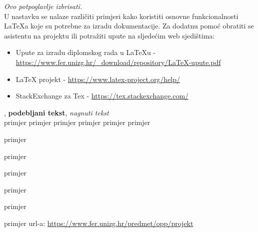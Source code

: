 \textit{Ovo potpoglavlje izbrisati.}\\

U nastavku se nalaze različiti primjeri kako koristiti osnovne funkcionalnosti LaTeXa koje su potrebne za izradu dokumentacije. Za dodatnu pomoć obratiti se asistentu na projektu ili potražiti upute na sljedećim web sjedištima:
\begin{itemize}
	\item Upute za izradu diplomskog rada u LaTeXu - \url{https://www.fer.unizg.hr/_download/repository/LaTeX-upute.pdf}
	\item LaTeX projekt - \url{https://www.latex-project.org/help/}
	\item StackExchange za Tex - \url{https://tex.stackexchange.com/}\\
	
\end{itemize} 	




, 
\textbf{podebljani tekst}, 
\textit{nagnuti tekst}\\
\normalsize primjer
\large primjer
\Large primjer
\LARGE {primjer}
\huge {primjer}
\Huge primjer
\normalsize

\begin{packed_item}
	
	\item  primjer
	\item  primjer
	\item  primjer
	\item[] \begin{packed_enum}
		
		\item primjer
		\item primjer
	\end{packed_enum}
	
\end{packed_item}

\noindent primjer url-a: \url{https://www.fer.unizg.hr/predmet/opp/projekt}


